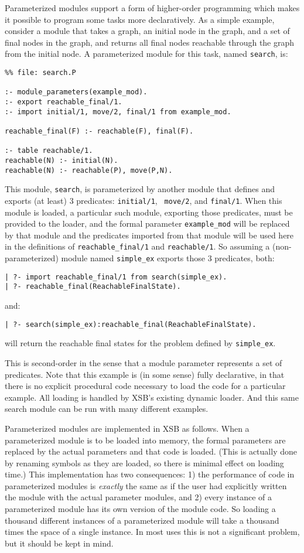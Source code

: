 Parameterized modules support a form of higher-order programming which
makes it possible to program some tasks more declaratively.  As a
simple example, consider a module that takes a graph, an initial node
in the graph, and a set of final nodes in the graph, and returns all
final nodes reachable through the graph from the initial node.  A
parameterized module for this task, named {\tt search}, is:
\begin{verbatim}
%% file: search.P

:- module_parameters(example_mod).
:- export reachable_final/1.
:- import initial/1, move/2, final/1 from example_mod.

reachable_final(F) :- reachable(F), final(F).

:- table reachable/1.
reachable(N) :- initial(N).
reachable(N) :- reachable(P), move(P,N).
\end{verbatim}
This module, {\tt search}, is parameterized by another module that
defines and exports (at least) 3 predicates: {\tt initial/1}, {\tt
  move/2}, and {\tt final/1}.  When this module is loaded, a
particular such module, exporting those predicates, must be provided to
the loader, and the formal parameter {\tt example\_mod} will be
replaced by that module and the predicates imported from that module
will be used here in the definitions of {\tt reachable\_final/1} and
{\tt reachable/1}.  So assuming a (non-parameterized) module named
{\tt simple\_ex} exports those 3 predicates, both:
\begin{verbatim}
| ?- import reachable_final/1 from search(simple_ex).
| ?- reachable_final(ReachableFinalState).
\end{verbatim}
and:
\begin{verbatim}
| ?- search(simple_ex):reachable_final(ReachableFinalState).
\end{verbatim}
will return the reachable final states for the problem defined by
{\tt simple\_ex}.

This is second-order in the sense that a module parameter represents a
set of predicates.  Note that this example is (in some sense) fully
declarative, in that there is no explicit procedural code necessary to
load the code for a particular example.  All loading is handled by
XSB's existing dynamic loader.  And this same search module can be
run with many different examples.

Parameterized modules are implemented in XSB as follows.  When a
parameterized module is to be loaded into memory, the formal
parameters are replaced by the actual parameters and that code is
loaded.  (This is actually done by renaming symbols as they are
loaded, so there is minimal effect on loading time.)  This
implementation has two consequences: 1) the performance of code in
parameterized modules is {\em exactly} the same as if the user had
explicitly written the module with the actual parameter modules, and
2) every instance of a parameterized module has its own version of the
module code.  So loading a thousand different instances of a
parameterized module will take a thousand times the space of a single
instance.  In most uses 
this is not a significant problem, but it should be kept in mind.

